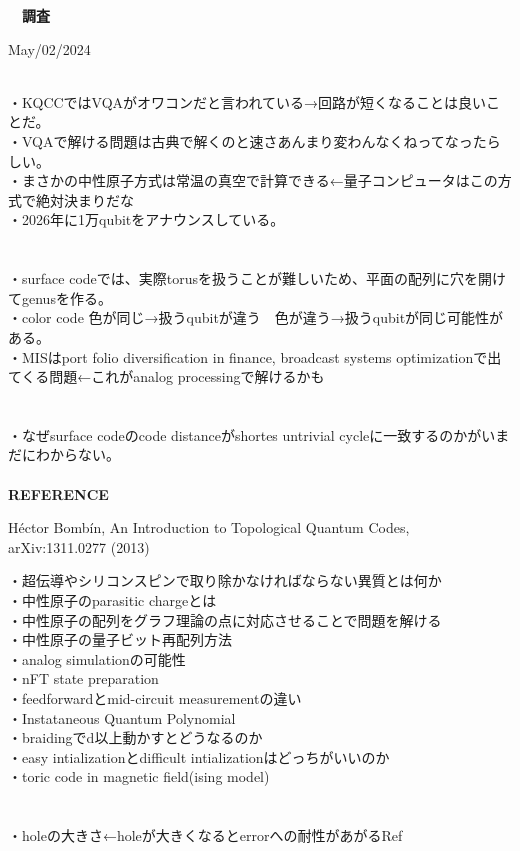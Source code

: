 \documentclass[a4paper,10.5pt]{ltjsarticle}
\begin{document}
\centerline
{\huge \bfseries　調査}
\rightline
{May/02/2024}
\leftline
{}

\\
・KQCCではVQAがオワコンだと言われている→回路が短くなることは良いことだ。\\
・VQAで解ける問題は古典で解くのと速さあんまり変わんなくねってなったらしい。\\
・まさかの中性原子方式は常温の真空で計算できる←量子コンピュータはこの方式で絶対決まりだな\\
・2026年に1万qubitをアナウンスしている。\\
\\
\\
・surface codeでは、実際torusを扱うことが難しいため、平面の配列に穴を開けてgenusを作る。\\
・color code 色が同じ→扱うqubitが違う　色が違う→扱うqubitが同じ可能性がある。\\
・MISはport folio diversification in finance, broadcast systems optimizationで出てくる問題←これがanalog processingで解けるかも\\
\\
\\
・なぜsurface codeのcode distanceがshortes untrivial cycleに一致するのかがいまだにわからない。\\
\\
{\Large \bfseries REFERENCE}
\begin{thebibliography}{1}
\vspace{-1.5cm}
   Héctor Bombín, An Introduction to Topological Quantum Codes, arXiv:1311.0277 (2013)
\end{thebibliography}
・超伝導やシリコンスピンで取り除かなければならない異質とは何か\\
・中性原子のparasitic chargeとは\\
・中性原子の配列をグラフ理論の点に対応させることで問題を解ける\\
・中性原子の量子ビット再配列方法\\
・analog simulationの可能性\\
・nFT state preparation\\
・feedforwardとmid-circuit measurementの違い\\
・Instataneous Quantum Polynomial\\
・braidingでd以上動かすとどうなるのか\\
・easy intializationとdifficult intializationはどっちがいいのか\\
・toric code in magnetic field(ising model)\\
\\
\\
・holeの大きさ←holeが大きくなるとerrorへの耐性があがるRef\cite{1}\\
\end{document}
